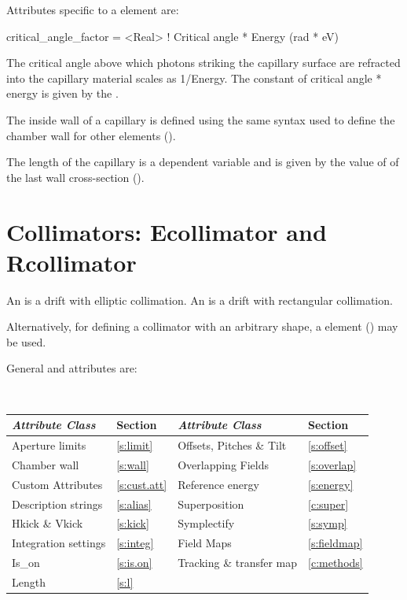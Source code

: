Attributes specific to a  element are:
\begin{example}
  critical_angle_factor = <Real>    ! Critical angle * Energy (rad * eV)
\end{example}

The critical angle above which photons striking the capillary surface are
refracted into the capillary material scales as 1/Energy. The
constant of critical angle * energy is given by the .

The inside wall of a capillary is defined using the same syntax used
to define the chamber wall for other elements ().

The length of the capillary is a dependent variable and is given by
the value of  of the last wall cross-section
().

\newpage

\section{Collimators: Ecollimator and Rcollimator} 
\label{s:col}

An  is a drift with elliptic collimation. An  is a drift
with rectangular collimation.

Alternatively, for defining a collimator with an arbitrary shape, a  element
() may be used.

General  and  attributes are:
\begin{center}
\tt
\begin{tabular}{llll} \toprule
  {\sl Attribute Class}      & Section          & {\sl Attribute Class}      & Section          \\ \midrule
  Aperture limits            & \ref{s:limit}    & Offsets, Pitches \& Tilt   & \ref{s:offset}   \\
  Chamber wall               & \ref{s:wall}     & Overlapping Fields         & \ref{s:overlap}  \\
  Custom Attributes          & \ref{s:cust.att} & Reference energy           & \ref{s:energy}   \\
  Description strings        & \ref{s:alias}    & Superposition              & \ref{c:super}    \\
  Hkick \& Vkick             & \ref{s:kick}     & Symplectify                & \ref{s:symp}     \\
  Integration settings       & \ref{s:integ}    & Field Maps                 & \ref{s:fieldmap} \\
  Is_on                      & \ref{s:is.on}    & Tracking \& transfer map   & \ref{c:methods}  \\
  Length                     & \ref{s:l}        &                            &                  \\
  \bottomrule
\end{tabular}
\end{center}
\toffset


